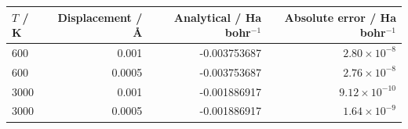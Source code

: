 \begin{tabular}{lrrr}\toprule
$T$ / K & Displacement / \AA & Analytical / Ha bohr$^{-1}$ & Absolute error / Ha bohr$^{-1}$\\\midrule
600 & 0.001 & -0.003753687 & $2.80\times10^{-8}$\\
600 & 0.0005 & -0.003753687 & $2.76\times10^{-8}$\\
3000 & 0.001 & -0.001886917 & $9.12\times10^{-10}$\\
3000 & 0.0005 & -0.001886917 & $1.64\times10^{-9}$\\
\bottomrule\end{tabular}
